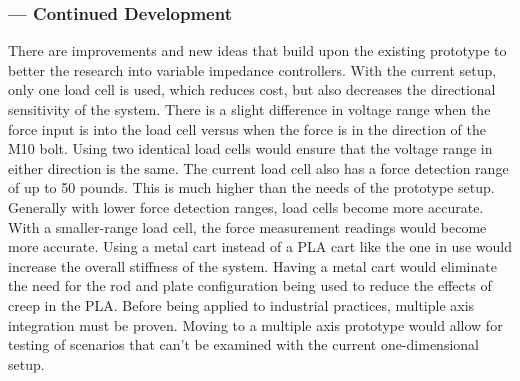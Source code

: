 \subsubsection*{ --- Continued Development}
There are improvements and new ideas that build upon the existing prototype to better the research into variable impedance controllers. With the current setup, only one load cell is used, which reduces cost, but also decreases the directional sensitivity of the system. There is a slight difference in voltage range when the force input is into the load cell versus when the force is in the direction of the M10 bolt. Using two identical load cells would ensure that the voltage range in either direction is the same. The current load cell also has a force detection range of up to 50 pounds. This is much higher than the needs of the prototype setup. Generally with lower force detection ranges, load cells become more accurate. With a smaller-range load cell, the force measurement readings would become more accurate. Using a metal cart instead of a PLA cart like the one in use would increase the overall stiffness of the system. Having a metal cart would eliminate the need for the rod and plate configuration being used to reduce the effects of creep in the PLA. Before being applied to industrial practices, multiple axis integration must be proven. Moving to a multiple axis prototype would allow for testing of scenarios that can't be examined with the current one-dimensional setup.
